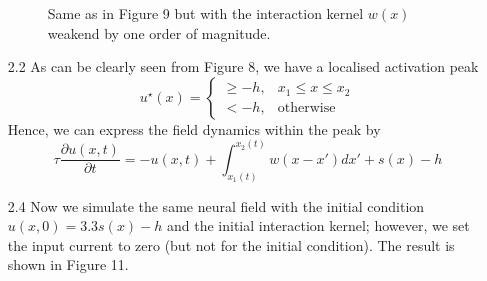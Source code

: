 \documentclass[12pt]{article}
\begin{document}
\begin{enumerate}
\begin{figure}[H]
    \caption{Same as in Figure 9 but with the interaction kernel $w(x)$ weakend by one order of magnitude.}
\end{figure}
\item[2.2] As can be clearly seen from Figure 8, we have a localised activation peak
\[
    u^{\star}(x)=\begin{cases}
                \geq -h, & x_{1} \leq x \leq x_{2}\\
                < -h, & \text{otherwise}
            \end{cases} 
\] 
Hence, we can express the field dynamics within the peak by
\[
    \tau \frac{\partial u(x, t)}{\partial t} = -u(x, t) + \int_{x_{1}(t)}^{x_{2}(t)}w(x-x')dx' + s(x) - h
\]

\item[2.4] Now we simulate the same neural field with the initial condition $u(x, 0)=3.3s(x)-h$ and the initial interaction kernel;
however, we set the input current to zero (but not for the initial condition). The result is shown in Figure 11. 
\begin{figure}[H]
    \centering

\end{figure}
\end{enumerate}
\end{document}
